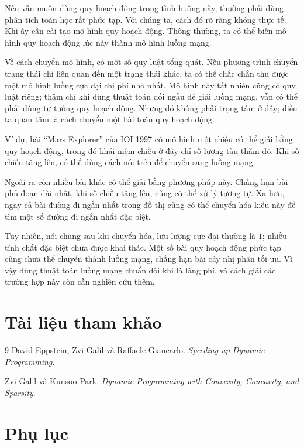 \documentclass[11pt]{article}
\begin{document}
Nếu vẫn muốn dùng quy hoạch động trong tình huống này, thường phải dùng phân
tích toán học rất phức tạp. Với chúng ta, cách đó rõ ràng không thực tế. Khi
ấy cần cải tạo mô hình quy hoạch động. Thông thường, ta có thể biến mô hình
quy hoạch động lúc này thành mô hình luồng mạng.

Về cách chuyển mô hình, có một số quy luật tổng quát. Nếu phương trình chuyển
trạng thái chỉ liên quan đến một trạng thái khác, ta có thể chắc chắn thu được
một mô hình luồng cực đại chi phí nhỏ nhất. Mô hình này tất nhiên cũng có quy
luật riêng; thậm chí khi dùng thuật toán đối ngẫu để giải luồng mạng, vẫn có
thể phải dùng tư tưởng quy hoạch động. Nhưng đó không phải trọng tâm ở đây;
điều ta quan tâm là cách chuyển một bài toán quy hoạch động.

Ví dụ, bài ``Mars Explorer'' của IOI 1997 có mô hình một chiều có thể giải
bằng quy hoạch động, trong đó khái niệm chiều ở đây chỉ số lượng tàu thăm dò.
Khi số chiều tăng lên, có thể dùng cách nói trên để chuyển sang luồng mạng.

Ngoài ra còn nhiều bài khác có thể giải bằng phương pháp này. Chẳng hạn bài
phủ đoạn dài nhất, khi số chiều tăng lên, cũng có thể xử lý tương tự. Xa hơn,
ngay cả bài đường đi ngắn nhất trong đồ thị cũng có thể chuyển hóa kiểu này để
tìm một số đường đi ngắn nhất đặc biệt.

Tuy nhiên, nói chung sau khi chuyển hóa, lưu lượng cực đại thường là \(1\);
nhiều tính chất đặc biệt chưa được khai thác. Một số bài quy hoạch động phức
tạp cũng chưa thể chuyển thành luồng mạng, chẳng hạn bài cây nhị phân tối ưu.
Vì vậy dùng thuật toán luồng mạng chuẩn đôi khi là lãng phí, và cách giải các
trường hợp này còn cần nghiên cứu thêm.

\section*{Tài liệu tham khảo}

\begin{thebibliography}{9}
David Eppstein, Zvi Galil và Raffaele Giancarlo.
\textit{Speeding up Dynamic Programming}.

Zvi Galil và Kunsoo Park.
\textit{Dynamic Programming with Convexity, Concavity, and Sparsity}.
\end{thebibliography}

\section*{Phụ lục}
\end{document}
